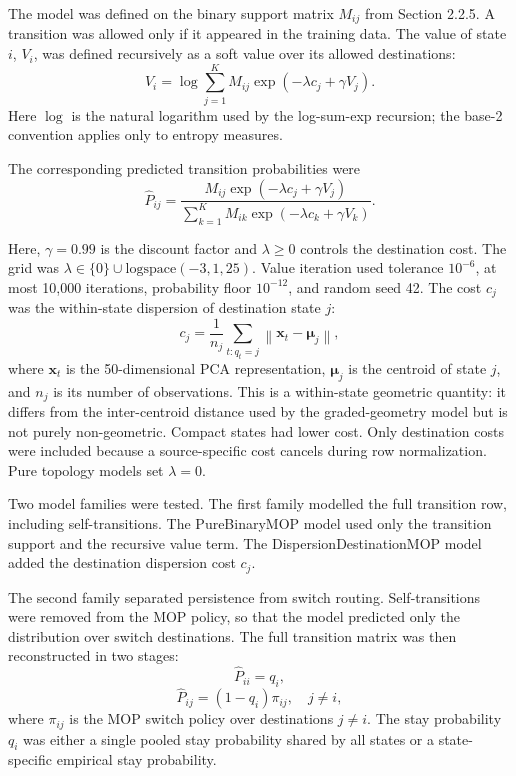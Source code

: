 \documentclass[12pt,a4paper]{report}
\begin{document}
The model was defined on the binary support matrix $M_{ij}$ from Section 2.2.5. A transition was allowed only if it appeared in the training data. The value of state $i$, $V_i$, was defined recursively as a soft value over its allowed destinations:
\begin{equation}
V_i
=
\log
\sum_{j=1}^{K}
M_{ij}
\exp(-\lambda c_j + \gamma V_j).
\end{equation}
Here $\log$ is the natural logarithm used by the log-sum-exp recursion; the base-2 convention applies only to entropy measures.

The corresponding predicted transition probabilities were
\begin{equation}
\hat{P}_{ij}
=
\frac{
M_{ij}\exp(-\lambda c_j + \gamma V_j)
}
{
\sum_{k=1}^{K}
M_{ik}\exp(-\lambda c_k + \gamma V_k)
}.
\end{equation}

Here, $\gamma=0.99$ is the discount factor and $\lambda\geq 0$ controls the destination cost. The grid was $\lambda\in\{0\}\cup\mathrm{logspace}(-3,1,25)$. Value iteration used tolerance $10^{-6}$, at most 10,000 iterations, probability floor $10^{-12}$, and random seed 42. The cost $c_j$ was the within-state dispersion of destination state $j$:
\begin{equation}
c_j
=
\frac{1}{n_j}
\sum_{t:q_t=j}
\left\lVert \mathbf{x}_t-\boldsymbol{\mu}_j \right\rVert,
\end{equation}
where $\mathbf{x}_t$ is the 50-dimensional PCA representation, $\boldsymbol{\mu}_j$ is the centroid of state $j$, and $n_j$ is its number of observations. This is a within-state geometric quantity: it differs from the inter-centroid distance used by the graded-geometry model but is not purely non-geometric. Compact states had lower cost. Only destination costs were included because a source-specific cost cancels during row normalization. Pure topology models set $\lambda=0$.

Two model families were tested. The first family modelled the full transition row, including self-transitions. The PureBinaryMOP model used only the transition support and the recursive value term. The DispersionDestinationMOP model added the destination dispersion cost $c_j$.

The second family separated persistence from switch routing. Self-transitions were removed from the MOP policy, so that the model predicted only the distribution over switch destinations. The full transition matrix was then reconstructed in two stages:
\begin{equation}
\hat{P}_{ii}=q_i,
\end{equation}
\begin{equation}
\hat{P}_{ij}
=
(1-q_i)\pi_{ij},
\quad j\neq i,
\end{equation}
where $\pi_{ij}$ is the MOP switch policy over destinations $j\neq i$. The stay probability $q_i$ was either a single pooled stay probability shared by all states or a state-specific empirical stay probability.
\end{document}
